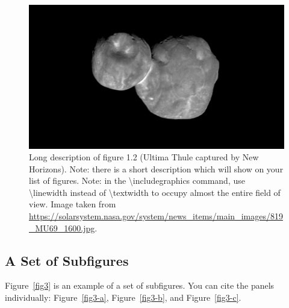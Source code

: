 \begin{landscape}
\begin{figure}[htb!]
\center
\includegraphics[width=\linewidth]{figures/819_MU69_1600.jpg}
\caption[Short description of the figure 1.2.]{Long description of figure 1.2 (Ultima Thule captured by New Horizons). Note: there is a short description which will show on your list of figures. Note: in the  \textbackslash{includegraphics} command, use \textbackslash{linewidth} instead of \textbackslash{textwidth} to occupy almost the entire field of view. Image taken from \url{https://solarsystem.nasa.gov/system/news_items/main_images/819_MU69_1600.jpg}.}
\label{fig2}
\end{figure}
\end{landscape}

\subsection{A Set of Subfigures}
Figure~\ref{fig3} is an example of a set of subfigures. You can cite the panels individually: Figure~\ref{fig3-a}, Figure~\ref{fig3-b}, and Figure~\ref{fig3-c}.


